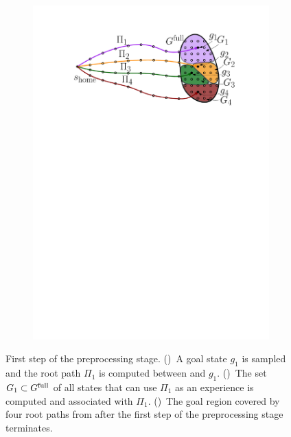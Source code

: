 \documentclass[conference]{IEEEtran}
\begin{document}
\begin{figure}[t]
\begin{subfigure}{0.225\textwidth}
        \includegraphics[width=\textwidth]{2_compute_root_paths_3}
        \caption{}
        \label{fig:crp3}
    \end{subfigure}
    \caption{\CaptionTextSize
    First step of the preprocessing stage.
    ()~A goal state $g_1$ is sampled and the root path $\Pi_1$ is computed between \Shome and $g_1$.
    ()~The set $G_1 \subset G^{\textrm{full}}$ of all states that can use $\Pi_1$ as an experience is computed and associated with $\Pi_1$.
    ()~The goal region covered by four root paths from \Shome after the first step of the preprocessing stage terminates.
    }
    \label{fig:crp}
\end{figure}
\end{document}
